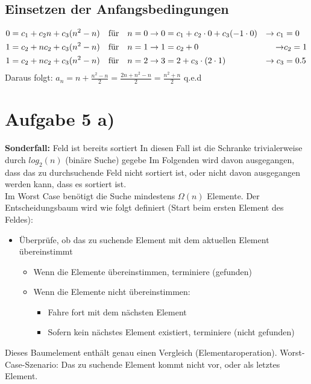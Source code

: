 \documentclass[a4paper,10pt,freqn]{article}
\begin{document}
\subsection{Einsetzen der Anfangsbedingungen}
\begin{align*}
 0&=c_1+c_2n+c_3(n^2-n) &\text{für\quad}& n = 0\rightarrow 0 = c_1+c_2\cdot0+c_3(-1\cdot0) &\rightarrow c_1& = 0\\
 1&=c_2+nc_2+c_3(n^2-n) &\text{für\quad}& n = 1\rightarrow 1 = c_2+0 &\rightarrow& c_2 = 1\\
 1&=c_2+nc_2+c_3(n^2-n) &\text{für\quad}& n = 2\rightarrow 3 = 2+c_3\cdot(2\cdot1) &\rightarrow c_3& = 0.5\\
\end{align*}
Daraus folgt: $a_n = n+\frac{n^2-n}{2}=\frac{2n+n^2-n}{2}=\frac{n^2+n}{2}$ q.e.d

\section{Aufgabe 5 a)}
\textbf{Sonderfall:} Feld ist bereits sortiert \textrightarrow In diesen Fall ist die Schranke trivialerweise durch $log_2(n)$ (binäre Suche) gegebe
\newline
Im Folgenden wird davon ausgegangen, dass das zu durchsuchende Feld nicht sortiert ist, oder nicht davon ausgegangen werden kann, dass es sortiert ist.\\
Im Worst Case benötigt die Suche mindestens $\Omega(n)$ Elemente.
Der Entscheidungsbaum wird wie folgt definiert (Start beim ersten Element des Feldes):
\begin{itemize}
 \item Überprüfe, ob das zu suchende Element mit dem aktuellen Element übereinstimmt
 \begin{itemize}
  \item Wenn die Elemente übereinstimmen, terminiere (gefunden)
  \item Wenn die Elemente nicht übereinstimmen:
  \begin{itemize}
   \item Fahre fort mit dem nächsten Element
   \item Sofern kein nächstes Element existiert, terminiere (nicht gefunden)
  \end{itemize}
 \end{itemize}
\end{itemize}
Dieses Baumelement enthält genau einen Vergleich (Elementaroperation).
Worst-Case-Szenario: Das zu suchende Element kommt nicht vor, oder als letztes Element.
\end{document}
